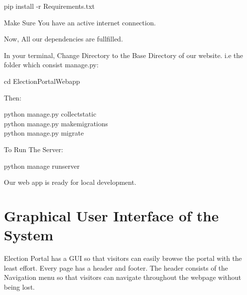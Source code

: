 \documentclass[12pt, a4paper, titlepage]{report}
\begin{document}
\begin{center}
pip install -r Requirements.txt
\end{center}
    
   
Make Sure You have an active internet connection.

Now, All our dependencies are fullfilled.

In your terminal, Change Directory to the Base Directory of our website. i.e the folder which consist manage.py:

\begin{center}
cd ElectionPortalWebapp
\end{center}

    
    
Then:
\begin{center}
    python manage.py collectstatic\\
    python manage.py makemigrations\\
    python manage.py migrate\\
\end{center}




To Run The Server:

\begin{center}
python manage runserver
\end{center}

Our web app is ready for local development.
    
\newpage
    
\section{Graphical User Interface of the System}
Election Portal has a GUI so that visitors can easily browse the portal with the least effort. Every page has a header and footer. The header consists of the Navigation menu so that visitors can navigate throughout the webpage without being lost.
\end{document}
